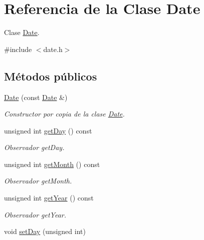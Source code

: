 \hypertarget{class_date}{}\section{Referencia de la Clase Date}
\label{class_date}


Clase \hyperlink{class_date}{Date}.  




{\ttfamily \#include $<$date.\+h$>$}

\subsection*{Métodos públicos}
\begin{DoxyCompactItemize}
\item 
\hyperlink{class_date_afa65693475fb86a2de04c8578b232201}{Date} (const \hyperlink{class_date}{Date} \&)\hypertarget{class_date_afa65693475fb86a2de04c8578b232201}{}\label{class_date_afa65693475fb86a2de04c8578b232201}

\begin{DoxyCompactList}\small\item\em Constructor por copia de la clase \hyperlink{class_date}{Date}. \end{DoxyCompactList}\item 
unsigned int \hyperlink{class_date_a254204c492d3ebc26a2c62d532e34844}{get\+Day} () const 
\begin{DoxyCompactList}\small\item\em Observador get\+Day. \end{DoxyCompactList}\item 
unsigned int \hyperlink{class_date_ac471b901531b7a1e73809918bac8c1ec}{get\+Month} () const 
\begin{DoxyCompactList}\small\item\em Observador get\+Month. \end{DoxyCompactList}\item 
unsigned int \hyperlink{class_date_a6561cf495bd6b7e6c747420d7ae9cc12}{get\+Year} () const 
\begin{DoxyCompactList}\small\item\em Observador get\+Year. \end{DoxyCompactList}\item 
void \hyperlink{class_date_aafe200d5fe2aa294a91d20a6b97afe75}{set\+Day} (unsigned int)\hypertarget{class_date_aafe200d5fe2aa294a91d20a6b97afe75}{}\label{class_date_aafe200d5fe2aa294a91d20a6b97afe75}


\end{DoxyCompactItemize}
